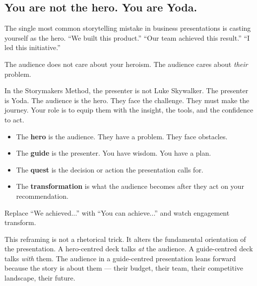 
\subsection{You are not the hero. You are Yoda.}


The single most common storytelling mistake in business presentations is casting yourself as the hero. ``We built this product.'' ``Our team achieved this result.'' ``I led this initiative.''

The audience does not care about your heroism. The audience cares about \emph{their} problem.


In the Storymakers Method, the presenter is not Luke Skywalker. The presenter is Yoda. The audience is the hero. They face the challenge. They must make the journey. Your role is to equip them with the insight, the tools, and the confidence to act.

\begin{keybox}
\begin{itemize}[leftmargin=1.2em]
  \item The \textbf{hero} is the audience. They have a problem. They face obstacles.
  \item The \textbf{guide} is the presenter. You have wisdom. You have a plan.
  \item The \textbf{quest} is the decision or action the presentation calls for.
  \item The \textbf{transformation} is what the audience becomes after they act on your recommendation.
\end{itemize}
Replace ``We achieved...'' with ``You can achieve...'' and watch engagement transform.
\end{keybox}

This reframing is not a rhetorical trick. It alters the fundamental orientation of the presentation. A hero-centred deck talks \emph{at} the audience. A guide-centred deck talks \emph{with} them. The audience in a guide-centred presentation leans forward because the story is about them --- their budget, their team, their competitive landscape, their future.

